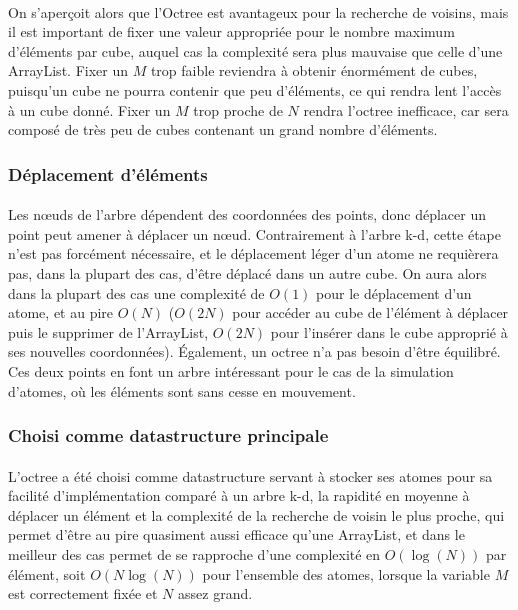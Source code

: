 \paragraph{}
On s'aperçoit alors que l'Octree est avantageux pour la recherche de voisins,
mais il est important de fixer une valeur appropriée pour le nombre maximum
d'éléments par cube, auquel cas la complexité sera plus mauvaise que celle
d'une ArrayList. Fixer un $M$ trop faible reviendra à obtenir énormément de
cubes, puisqu'un cube ne pourra contenir que peu d'éléments, ce qui rendra lent
l'accès à un cube donné. Fixer un $M$ trop proche de $N$ rendra l'octree
inefficace, car sera composé de très peu de cubes contenant un grand nombre
d'éléments.


\subsubsection{Déplacement d'éléments}
\paragraph{}
Les nœuds de l'arbre dépendent des coordonnées des points, donc déplacer un
point peut amener à déplacer un nœud. Contrairement à l'arbre k-d, cette étape
n'est pas forcément nécessaire, et le déplacement léger d'un atome ne
requièrera pas, dans la plupart des cas, d'être déplacé dans un autre cube.  On
aura alors dans la plupart des cas une complexité de $O(1)$ pour le déplacement
d'un atome, et au pire $O(N)$ ($O(2N)$ pour accéder au cube de l'élément à
déplacer puis le supprimer de l'ArrayList, $O(2N)$ pour l'insérer dans le cube
approprié à ses nouvelles coordonnées). Également, un octree n'a pas besoin
d'être équilibré. Ces deux points en font un arbre intéressant pour le cas de
la simulation d'atomes, où les éléments sont sans cesse en mouvement.


\subsubsection{Choisi comme datastructure principale}
\paragraph{}
L'octree a été choisi comme datastructure servant à stocker ses atomes pour sa
facilité d'implémentation comparé à un arbre k-d, la rapidité en moyenne à
déplacer un élément et la complexité de la recherche de voisin le plus proche,
qui permet d'être au pire quasiment aussi efficace qu'une ArrayList, et dans le
meilleur des cas permet de se rapproche d'une complexité en $O(\log(N))$ par
élément, soit $O(N\log(N))$ pour l'ensemble des atomes, lorsque la variable $M$
est correctement fixée et $N$ assez grand.

